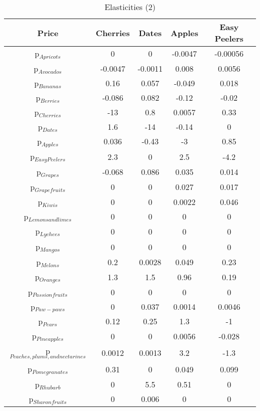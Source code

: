 \documentclass[11pt]{article}
\begin{document}
\begin{table}[h]
\caption{Elasticities (2)}
\label{Table: elasticities 2}
\begin{center}
\begin{tabular}{ccccc}
Price & Cherries & Dates & Apples & Easy Peelers \\ \hline
p$_{Apricots}$ & 0 & 0 & -0.0047 & -0.00056 \\ 
p$_{Avocados}$ & -0.0047 & -0.0011 & 0.008 & 0.0056 \\ 
p$_{Bananas}$ & 0.16 & 0.057 & -0.049 & 0.018 \\ 
p$_{Berries}$ & -0.086 & 0.082 & -0.12 & -0.02 \\ 
p$_{Cherries}$ & -13 & 0.8 & 0.0057 & 0.33 \\ 
p$_{Dates}$ & 1.6 & -14 & -0.14 & 0 \\ 
p$_{Apples}$ & 0.036 & -0.43 & -3 & 0.85 \\ 
p$_{Easy Peelers}$ & 2.3 & 0 & 2.5 & -4.2 \\ 
p$_{Grapes}$ & -0.068 & 0.086 & 0.035 & 0.014 \\ 
p$_{Grapefruits}$ & 0 & 0 & 0.027 & 0.017 \\ 
p$_{Kiwis}$ & 0 & 0 & 0.0022 & 0.046 \\ 
p$_{Lemons and limes}$ & 0 & 0 & 0 & 0 \\ 
p$_{Lychees}$ & 0 & 0 & 0 & 0 \\ 
p$_{Mangos}$ & 0 & 0 & 0 & 0 \\ 
p$_{Melons}$ & 0.2 & 0.0028 & 0.049 & 0.23 \\ 
p$_{Oranges}$ & 1.3 & 1.5 & 0.96 & 0.19 \\ 
p$_{Passion fruits}$ & 0 & 0 & 0 & 0 \\ 
p$_{Paw-paws}$ & 0 & 0.037 & 0.0014 & 0.0046 \\ 
p$_{Pears}$ & 0.12 & 0.25 & 1.3 & -1 \\ 
p$_{Pineapples}$ & 0 & 0 & 0.0056 & -0.028 \\ 
p$_{Peaches, plums, and nectarines}$ & 0.0012 & 0.0013 & 3.2 & -1.3 \\ 
p$_{Pomegranates}$ & 0.31 & 0 & 0.049 & 0.099 \\ 
p$_{Rhubarb}$ & 0 & 5.5 & 0.51 & 0 \\ 
p$_{Sharon fruits}$ & 0 & 0.006 & 0 & 0 \\ 
\end{tabular}
\end{center}
\end{table}
\end{document}
